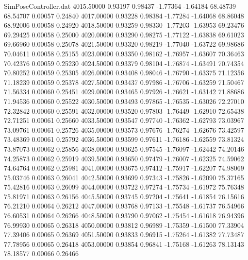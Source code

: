 \begin{filecontents}{SimPoseController.dat}
4015.50000    0.93197    0.98437    -1.77364   -1.64184   68.48739   68.54707    0.00057    0.24840
4017.00000    0.93228    0.98384    -1.77284   -1.64068   68.86048   68.92006    0.00058    0.24920
4018.50000    0.93259    0.98330    -1.77203   -1.63953   69.23476   69.29425    0.00058    0.25000
4020.00000    0.93290    0.98275    -1.77122   -1.63838   69.61023   69.66960    0.00058    0.25078
4021.50000    0.93320    0.98219    -1.77040   -1.63722   69.98686   70.04611    0.00058    0.25155
4023.00000    0.93350    0.98162    -1.76957   -1.63607   70.36463   70.42376    0.00059    0.25230
4024.50000    0.93379    0.98104    -1.76874   -1.63491   70.74354   70.80252    0.00059    0.25305
4026.00000    0.93408    0.98046    -1.76790   -1.63375   71.12356   71.18239    0.00059    0.25378
4027.50000    0.93437    0.97986    -1.76706   -1.63259   71.50467   71.56334    0.00060    0.25451
4029.00000    0.93465    0.97926    -1.76621   -1.63142   71.88686   71.94536    0.00060    0.25522
4030.50000    0.93493    0.97865    -1.76535   -1.63026   72.27010   72.32842    0.00060    0.25591
4032.00000    0.93520    0.97803    -1.76449   -1.62910   72.65438   72.71251    0.00061    0.25660
4033.50000    0.93547    0.97740    -1.76362   -1.62793   73.03967   73.09761    0.00061    0.25726
4035.00000    0.93573    0.97676    -1.76274   -1.62676   73.42597   73.48369    0.00061    0.25792
4036.50000    0.93599    0.97611    -1.76186   -1.62559   73.81324   73.87073    0.00062    0.25856
4038.00000    0.93625    0.97545    -1.76097   -1.62442   74.20146   74.25873    0.00062    0.25919
4039.50000    0.93650    0.97479    -1.76007   -1.62325   74.59062   74.64764    0.00062    0.25981
4041.00000    0.93675    0.97412    -1.75917   -1.62207   74.98069   75.03746    0.00063    0.26041
4042.50000    0.93699    0.97343    -1.75826   -1.62090   75.37165   75.42816    0.00063    0.26099
4044.00000    0.93722    0.97274    -1.75734   -1.61972   75.76348   75.81971    0.00063    0.26156
4045.50000    0.93745    0.97204    -1.75641   -1.61854   76.15616   76.21210    0.00064    0.26212
4047.00000    0.93768    0.97133    -1.75548   -1.61737   76.54966   76.60531    0.00064    0.26266
4048.50000    0.93790    0.97062    -1.75454   -1.61618   76.94396   76.99930    0.00065    0.26318
4050.00000    0.93812    0.96989    -1.75359   -1.61500   77.33904   77.39406    0.00065    0.26369
4051.50000    0.93833    0.96915    -1.75264   -1.61382   77.73487   77.78956    0.00065    0.26418
4053.00000    0.93854    0.96841    -1.75168   -1.61263   78.13143   78.18577    0.00066    0.26466

\end{filecontents}
